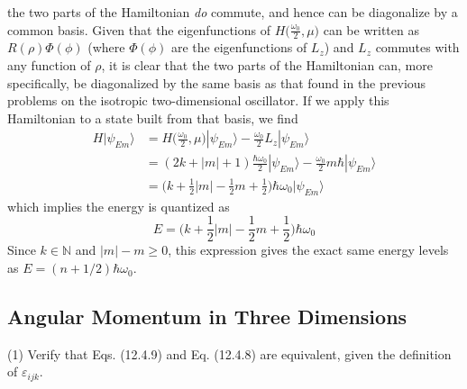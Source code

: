 \documentclass[../principles-of-quantum-mechanics.tex]{subfiles}
\begin{document}
\begin{questions}
\begin{solution}
		the two parts of the Hamiltonian \textit{do} commute, and hence can be diagonalize by a common basis. Given that the eigenfunctions of $H\big(\frac{\omega_0}{2}, \mu\big)$ can be written as $R(\rho)\Phi(\phi)$ (where $\Phi(\phi)$ are the eigenfunctions of $L_z$) and $L_z$ commutes with any function of $\rho$, it is clear that the two parts of the Hamiltonian can, more specifically, be diagonalized by the same basis as that found in the previous problems on the isotropic two-dimensional oscillator. If we apply this Hamiltonian to a state built from that basis, we find
		\begin{align*} 
			H|\psi_{Em}\rangle &= H\Big(\frac{\omega_0}{2}, \mu\Big)|\psi_{Em}\rangle - \frac{\omega_0}{2}L_z|\psi_{Em}\rangle \\
			&= (2k + |m| + 1)\frac{\hbar\omega_0}{2}|\psi_{Em}\rangle - \frac{\omega_0}{2}m\hbar|\psi_{Em}\rangle \\
			&= \Big(k + \frac{1}{2}|m| - \frac{1}{2}m + \frac{1}{2}\Big)\hbar\omega_0|\psi_{Em}\rangle
		\end{align*}
		which implies the energy is quantized as
		$$E = \Big(k + \frac{1}{2}|m| - \frac{1}{2}m + \frac{1}{2}\Big)\hbar\omega_0$$
		Since $k \in \mathbb{N}$ and $|m| - m \geq 0$, this expression gives the exact same energy levels as $E = (n + 1/2)\hbar\omega_0$.
	\end{solution}

	\setcounter{subsection}{3}
	\setcounter{question}{0}
	\subsection{Angular Momentum in Three Dimensions}
	\question (1) Verify that Eqs. (12.4.9) and Eq. (12.4.8) are equivalent, given the definition of $\varepsilon_{ijk}$.
	

\end{questions}
\end{document}
